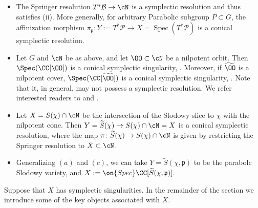 \documentclass[12pt]{amsart}
\begin{document}
        \begin{example*}
            \begin{itemize}
                \item[(a)] 
                The Springer resolution $T^*\mathcal{B} \to \cN$ is a symplectic resolution and thus satisfies (ii). More generally, for arbitrary Parabolic subgroup $P \subset G$, the affinization morphism $\pi_{\mathfrak{p}}\colon Y:=T^*\mathcal{P} \rightarrow X=\operatorname{Spec}(T^*\mathcal{P})$ is a conical symplectic resolution.
                \item[(b)] Let $G$ and $\cN$ be as above, and let $\OO\subset \cN$ be a nilpotent orbit. Then $\Spec(\CC[\OO])$ is a conical symplectic singularity, \cite{Panyushev1991}. Moreover, if $\widetilde{\OO}$ is a nilpotent cover, $\Spec(\CC[\widetilde{\OO}])$ is a conical symplectic singularity, \cite[Lemma 2.5]{LosevHC}. Note that it, in general, may not possess a symplectic resolution. We refer interested readers to \cite{Fu_2003} and \cite{Fu2003}.  
                \item[(c)] Let $X=S(\chi) \cap \cN$ be the intersection of the Slodowy slice to $\chi$ with the nilpotent cone. Then $Y=\widetilde{S}(\chi) \rightarrow S(\chi) \cap \cN=X$ is a conical symplectic resolution, where the map $\pi\colon \widetilde{S}(\chi) \to S(\chi) \cap \cN$ is given by restricting the Springer resolution to $X\subset \cN$. 
                \item[(d)] Generalizing $(a)$ and $(c)$, we can take $Y=\widetilde{S}(\chi,\mathfrak{p})$ to be the parabolc Slodowy variety, and $X:=\on{Spec}\CC[\widetilde{S}(\chi,\mathfrak{p})]$.
            \end{itemize}
        \end{example*}


        Suppose that $X$ has symplectic singularities. In the remainder of the section we introduce some of the key objects associated with $X$. 
        
\end{document}
